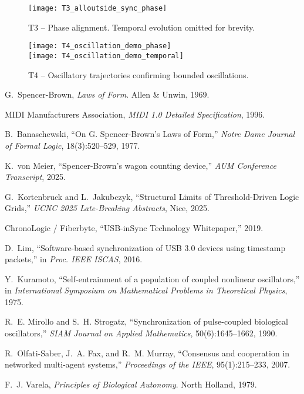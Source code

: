 \documentclass[11pt]{article}
\begin{document}
\begin{figure}[htbp!]
  \centering
  \texttt{[image: T3\_alloutside\_sync\_phase]}
  \caption{T3 -- Phase alignment. Temporal evolution omitted for brevity.}
\end{figure}

\begin{figure}[htbp!]
  \centering
  \texttt{[image: T4\_oscillation\_demo\_phase]}\\[4pt]
  \texttt{[image: T4\_oscillation\_demo\_temporal]}
  \caption{T4 -- Oscillatory trajectories confirming bounded oscillations.}
\end{figure}

\begin{thebibliography}{99}
\setlength{\itemsep}{2pt}

G.~Spencer-Brown, \emph{Laws of Form}. Allen \& Unwin, 1969.

MIDI Manufacturers Association, \emph{MIDI 1.0 Detailed Specification}, 1996.

B.~Banaschewski, ``On G. Spencer-Brown's Laws of Form,'' \emph{Notre Dame Journal of Formal Logic}, 18(3):520--529, 1977.

K.~von Meier, ``Spencer-Brown's wagon counting device,'' \emph{AUM Conference Transcript}, 2025. %

G.~Kortenbruck and L.~Jakubczyk, ``Structural Limits of Threshold-Driven Logic Grids,'' \emph{UCNC 2025 Late-Breaking Abstracts}, Nice, 2025.

ChronoLogic / Fiberbyte, ``USB-inSync Technology Whitepaper,'' 2019. %

D.~Lim, ``Software-based synchronization of USB 3.0 devices using timestamp packets,'' in \emph{Proc. IEEE ISCAS}, 2016.

Y.~Kuramoto, ``Self-entrainment of a population of coupled nonlinear oscillators,'' in \emph{International Symposium on Mathematical Problems in Theoretical Physics}, 1975.

R.~E. Mirollo and S.~H. Strogatz, ``Synchronization of pulse-coupled biological oscillators,'' \emph{SIAM Journal on Applied Mathematics}, 50(6):1645--1662, 1990.

R.~Olfati-Saber, J.~A. Fax, and R.~M. Murray, ``Consensus and cooperation in networked multi-agent systems,'' \emph{Proceedings of the IEEE}, 95(1):215--233, 2007.

F.~J. Varela, \emph{Principles of Biological Autonomy}. North Holland, 1979.

\end{thebibliography}
\end{document}
